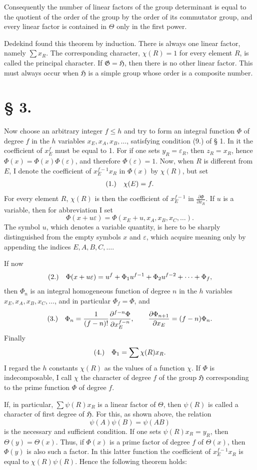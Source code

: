 \documentclass[11pt]{article}
\makeatletter
\newcommand{\Hgrp}{\mathfrak{H}}
\newcommand{\Ggrp}{\mathfrak{G}}
\newcommand{\frobtagc}[2]{\[\begin{array}{@{}r@{\quad}c@{}}\textup{(#1)} & \displaystyle #2\end{array}\]}
\makeatother
\begin{document}
Consequently the number of linear factors of the group determinant is equal to the quotient of the order of the group by the order of its commutator group, and every linear factor is contained in $\Theta$ only in the first power.

Dedekind found this theorem by induction. There is always one linear factor, namely $\sum x_R$. The corresponding character, $\chi(R)=1$ for every element $R$, is called the principal character. If $\Ggrp=\Hgrp$, then there is no other linear factor. This must always occur when $\Hgrp$ is a simple group whose order is a composite number.

\section*{§ 3.}

Now choose an arbitrary integer $f\le h$ and try to form an integral function $\Phi$ of degree $f$ in the $h$ variables $x_E,x_A,x_B,\ldots$, satisfying condition (9.) of § 1. In it the coefficient of $x_E^f$ must be equal to 1. For if one sets $y_R=\varepsilon_R$, then $z_R=x_R$, hence $\Phi(x)=\Phi(x)\Phi(\varepsilon)$, and therefore $\Phi(\varepsilon)=1$. Now, when $R$ is different from $E$, I denote the coefficient of $x_E^{f-1}x_R$ in $\Phi(x)$ by $\chi(R)$, but set
\frobtagc{1.}{\chi(E)=f.}
For every element $R$, $\chi(R)$ is then the coefficient of $x_E^{f-1}$ in $\frac{\partial\Phi}{\partial x_R}$. If $u$ is a variable, then for abbreviation I set
\[
\Phi(x+u\varepsilon)=\Phi(x_E+u,x_A,x_B,x_C,\ldots).
\]
The symbol $u$, which denotes a variable quantity, is here to be sharply distinguished from the empty symbols $x$ and $\varepsilon$, which acquire meaning only by appending the indices $E,A,B,C,\ldots$.

If now
\frobtagc{2.}{\Phi(x+u\varepsilon)=u^f+\Phi_1u^{f-1}+\Phi_2u^{f-2}+\cdots+\Phi_f,}
then $\Phi_n$ is an integral homogeneous function of degree $n$ in the $h$ variables $x_E,x_A,x_B,x_C,\ldots$, and in particular $\Phi_f=\Phi$, and
\frobtagc{3.}{\Phi_n=\frac{1}{(f-n)!}\frac{\partial^{f-n}\Phi}{\partial x_E^{f-n}},\qquad \frac{\partial\Phi_{n+1}}{\partial x_E}=(f-n)\Phi_n.}
Finally
\frobtagc{4.}{\Phi_1=\sum\chi(R)x_R.}
I regard the $h$ constants $\chi(R)$ as the values of a function $\chi$. If $\Phi$ is indecomposable, I call $\chi$ the character of degree $f$ of the group $\Hgrp$ corresponding to the prime function $\Phi$ of degree $f$.

If, in particular, $\sum\psi(R)x_R$ is a linear factor of $\Theta$, then $\psi(R)$ is called a character of first degree of $\Hgrp$. For this, as shown above, the relation
\[
\psi(A)\psi(B)=\psi(AB)
\]
is the necessary and sufficient condition. If one sets $\psi(R)x_R=y_R$, then $\Theta(y)=\Theta(x)$. Thus, if $\Phi(x)$ is a prime factor of degree $f$ of $\Theta(x)$, then $\Phi(y)$ is also such a factor. In this latter function the coefficient of $x_E^{f-1}x_R$ is equal to $\chi(R)\psi(R)$. Hence the following theorem holds:
\end{document}
